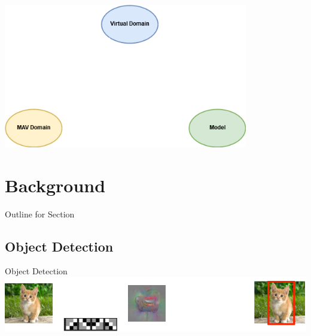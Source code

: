 \documentclass{beamer}
\begin{document}
\begin{darkframes}
\begin{frame}
\centering
\includegraphics[width=0.8\textwidth]{fig/triangle_white}
\end{frame}
    \section{Background}
    \begin{frame}{Outline for Section \thesection}
    \tableofcontents[currentsection]
	\end{frame}
\subsection{Object Detection}
	\begin{frame}{Object Detection}
	\includegraphics[width=\textwidth]{fig/ObjectDetection}
	\end{frame}

\end{darkframes}
\end{document}
